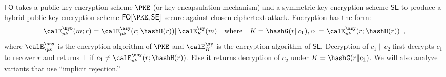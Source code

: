 $\mathsf{FO}$   takes a public-key encryption   scheme $\PKE$ (or key-encapsulation mechanism) and a symmetric-key encryption scheme $\mathsf{SE}$ to produce a hybrid public-key encryption scheme  $\mathsf{FO}[\PKE,\mathsf{SE}]$ secure against chosen-ciphertext attack. Encryption has the form:
\[
\calE^{\hyb}_{pk}(m;r) = 
\calE^{\asy}_{pk}(r; \hashH(r)) \| \calE^{\sy}_{K}(m) 
\quad \mbox{where} \quad
K = \hashG(r \| c_1), c_1 = \calE^{\asy}_{pk}(r; \hashH(r))
\enspace,
\]
where $\calE^{\asy}_\pk$ is the encryption algorithm of $\PKE$ and $\calE^{\sy}_K$ is the encryption algorithm of $\mathsf{SE}$. Decryption of $c_1 \| c_2$ first decrypts $c_1$ to recover $r$ and returns $\bot$ if  $c_1 \neq \calE^{\asy}_{pk}(r; \hashH(r))$. Else it returns decryption of $c_2$ under $K = \hashG(r \| c_1)$. We will also analyze   variants that use   ``implicit rejection.''

